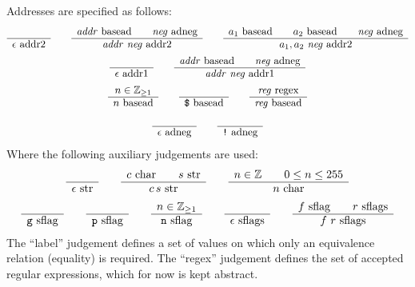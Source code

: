 \documentclass[11pt]{article}
\newcommand\RULE[2]{\begin{array}{c} #1 \\ \hline #2 \end{array}}
\newcommand\J[1]{\ensuremath{\text{ #1}}}
\newcommand\cmd[1]{\ensuremath{\text{\texttt{#1}}}}
\renewcommand\arg[1]{\ensuremath{\mathit{#1}}}
\begin{document}
Addresses are specified as follows:
\begin{gather*}
	\RULE{}{\epsilon \J{addr2}} \qquad
	\RULE{\arg{addr} \J{basead} \qquad \arg{neg} \J{adneg}}{\arg{addr}\ \arg{neg} \J{addr2}} \qquad
	\RULE{a_1 \J{basead} \qquad a_2 \J{basead} \qquad \arg{neg} \J{adneg}}{a_1,a_2\ \arg{neg} \J{addr2}} \\
	\RULE{}{\epsilon \J{addr1}} \qquad
	\RULE{\arg{addr} \J{basead} \qquad \arg{neg} \J{adneg}}{\arg{addr}\ \arg{neg} \J{addr1}} \\
	\RULE{n \in \mathbb{Z}_{\geq 1}}{n \J{basead}} \qquad
	\RULE{}{\cmd{\$} \J{basead}} \qquad
	\RULE{\arg{reg} \J{regex}}{\arg{reg} \J{basead}} \\
	\RULE{}{\epsilon \J{adneg}} \qquad
	\RULE{}{\cmd{!} \J{adneg}}
\end{gather*}
Where the following auxiliary judgements are used:
\begin{gather*}
	\RULE{}{\epsilon \J{str}} \qquad
	\RULE{c \J{char} \qquad s \J{str}}{c\,s \J{str}} \qquad
	\RULE{n \in \mathbb{Z} \qquad 0 \leq n \leq 255}{n \J{char}} \\
	\RULE{}{\cmd{g} \J{sflag}} \qquad
	\RULE{}{\cmd{p} \J{sflag}} \qquad
	\RULE{n \in \mathbb{Z}_{\geq 1}}{\cmd{n} \J{sflag}} \qquad
	\RULE{}{\epsilon \J{sflags}} \qquad
	\RULE{f \J{sflag} \qquad r \J{sflags}}{f\ r \J{sflags}}
\end{gather*}
The ``label'' judgement defines a set of values on which only an equivalence relation (equality) is required.
The ``regex'' judgement defines the set of accepted regular expressions, which for now is kept abstract.
\end{document}
